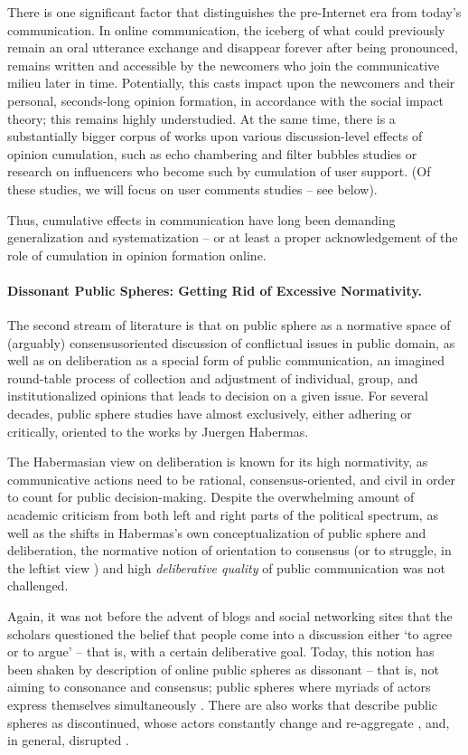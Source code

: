 There is one significant factor that distinguishes the pre-Internet era from today’s communication. In online communication, the iceberg of what could previously remain an oral utterance exchange and disappear forever after being pronounced, remains written and accessible by the newcomers who join the communicative milieu later in time. Potentially, this casts impact upon the newcomers and their personal, seconds-long opinion formation, in accordance with the social impact theory; this remains highly understudied. At the same time, there is a substantially bigger corpus of works upon various discussion-level effects of opinion cumulation, such as echo chambering and filter bubbles studies or research on influencers who become such by cumulation of user support. (Of these studies, we will focus on user comments studies -- see below).

Thus, cumulative effects in communication have long been demanding generalization
and systematization -- or at least a proper acknowledgement of the role of cumulation in
opinion formation online.

\paragraph{Dissonant Public Spheres: Getting Rid of Excessive Normativity.} The second stream of literature is that on public sphere as a normative space of (arguably) consensusoriented discussion of conflictual issues in public domain, as well as on deliberation as a special form of public communication, an imagined round-table process of collection and adjustment of individual, group, and institutionalized opinions that leads to decision on a given issue. For several decades, public sphere studies have almost exclusively, either adhering or critically, oriented to the works by Juergen Habermas.

The Habermasian view on deliberation is known for its high normativity, as communicative actions need to be rational, consensus-oriented, and civil in order to count for public decision-making. Despite the overwhelming amount of academic criticism from both left and right parts of the political spectrum, as well as the shifts in Habermas’s own conceptualization of public sphere and deliberation, the normative notion of orientation to consensus (or to struggle, in the leftist view \cite{Mouffe}) and high \textit{deliberative quality} of public communication was not challenged.

Again, it was not before the advent of blogs and social networking sites that the scholars questioned the belief that people come into a discussion either ‘to agree or to argue’ \cite{YardiBoyd} -- that is, with a certain deliberative goal. Today, this notion has been shaken by description of online public spheres as dissonant -- that is, not aiming to consonance and consensus; public spheres where myriads of actors express themselves simultaneously \cite{Pfetsch}. There are also works that describe public spheres as discontinued, whose actors constantly change and re-aggregate \cite{SmoliarovaBodrunovaBlekanov2020}, and, in general, disrupted \cite{BennettPfetsch}.

